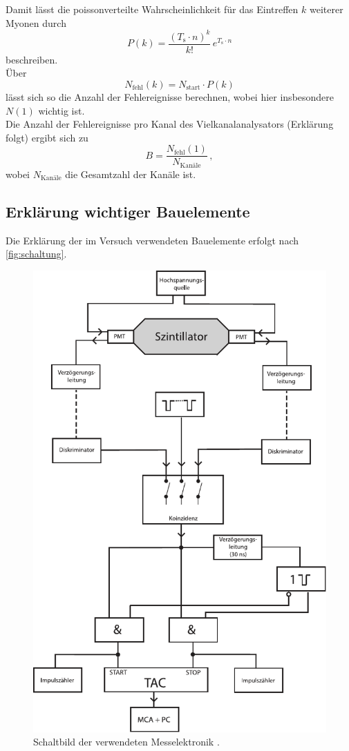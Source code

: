 Damit lässt die poissonverteilte Wahrscheinlichkeit für das Eintreffen $k$ weiterer Myonen durch
\begin{equation*}
    P(k) = \frac{(T_\text{s} \cdot n)^k}{k!} \, e^{T_\text{s} \cdot n}
\end{equation*}
beschreiben. \\

Über
\begin{equation*}
    N_\text{fehl} (k) = N_\text{start} \cdot P(k)
\end{equation*}
lässt sich so die Anzahl der Fehlereignisse berechnen, wobei hier insbesondere $N(1)$ wichtig ist. \\

Die Anzahl der Fehlereignisse pro Kanal des Vielkanalanalysators (Erklärung folgt) ergibt sich zu
\begin{equation}
    B = \frac{N_\text{fehl} (1)}{N_\text{Kanäle}} \,,
\end{equation}
wobei $N_\text{Kanäle}$ die Gesamtzahl der Kanäle ist.


\newpage

\subsection{Erklärung wichtiger Bauelemente}

Die Erklärung der im Versuch verwendeten Bauelemente erfolgt nach \autoref{fig:schaltung}.

\begin{figure}[H]
    \centering
    \includegraphics[width=.6\textwidth]{figures/V01.pdf}
    \caption{Schaltbild der verwendeten Messelektronik \cite{ap03}.}
    \label{fig:schaltung}
\end{figure}

